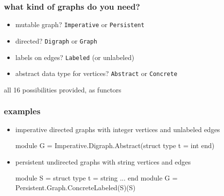 \documentclass{beamer}
\newcommand{\bleu}[1]{{\color{blue}#1}}
\newcommand{\monvert}[1]{{\color{blue}#1}}
\newcommand{\excode}[1]{\monvert{\texttt{#1}}}
\let\emph\alert
\begin{document}
\begin{frame}[containsverbatim]
  \frametitle{what kind of graphs do you need?}

  \begin{itemize}
  \item mutable graph?
    \hfill \excode{Imperative} or \excode{Persistent}
    \vskip10pt
  \item directed?
    \hfill \excode{Digraph} or \excode{Graph}
    \vskip10pt
  \item labels on edges?
    \hfill \excode{Labeled} (or unlabeled)
    \vskip10pt
  \item abstract data type for vertices?
    \hfill \excode{Abstract} or \excode{Concrete}
    \vskip10pt
  \end{itemize}

\bigskip
\begin{center}
all 16 possibilities provided, as \emph{functors}
\end{center}
\end{frame}

\begin{frame}[fragile]
  \frametitle{examples}
  \begin{itemize}
  \item imperative directed graphs with integer vertices and unlabeled edges
\medskip
    \begin{ocaml}
module G =
  Imperative.Digraph.Abstract(struct type t = int end)
    \end{ocaml}

  \item persistent undirected graphs with string vertices and edges
\medskip
    \begin{ocaml}
module S = struct type t = string ... end
module G = Persistent.Graph.ConcreteLabeled(S)(S)
    \end{ocaml}
  \end{itemize}
\end{frame}

\end{document}
